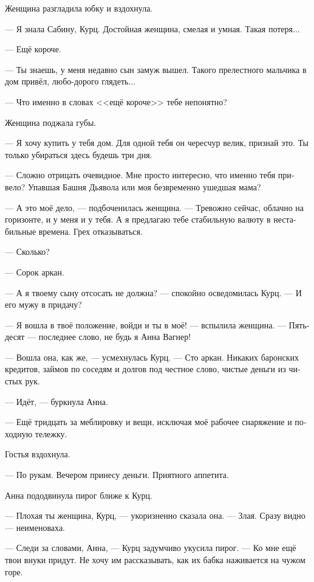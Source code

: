 \documentclass[a4paper,10pt,fleqn]{book}\usepackage{polyglossia}\setdefaultlanguage[babelshorthands=true]{russian}\setotherlanguage{english}\defaultfontfeatures{Ligatures=TeX,Mapping=tex-text}\usepackage{xcolor}\newcommand{\ml}[3]{#2}
\begin{document}
Женщина разгладила юбку и вздохнула.

--- Я знала Сабину, Курц.
Достойная женщина, смелая и умная.
Такая потеря...

--- Ещё короче.

--- Ты знаешь, у меня недавно сын замуж вышел.
Такого прелестного мальчика в дом привёл, любо-дорого глядеть...

--- Что именно в словах <<ещё короче>> тебе непонятно?

Женщина поджала губы.

--- Я хочу купить у тебя дом.
Для одной тебя он чересчур велик, признай это.
Ты только убираться здесь будешь три дня.

--- Сложно отрицать очевидное.
Мне просто интересно, что именно тебя привело?
Упавшая Башня Дьявола или моя безвременно ушедшая мама?

--- А это моё дело, --- подбоченилась женщина.
--- Тревожно сейчас, облачно на горизонте, и у меня и у тебя.
\ml{$0$}
{А я предлагаю тебе стабильную валюту в нестабильные времена.}
{All I offer you is stable currency for unstable times.}
\ml{$0$}
{Грех отказываться.}
{Too good a chance to miss.''}

--- Сколько?

--- Сорок аркан.

--- А я твоему сыну отсосать не должна? --- спокойно осведомилась Курц.
--- И его мужу в придачу?

--- Я вошла в твоё положение, войди и ты в моё! --- вспылила женщина.
--- Пятьдесят --- последнее слово, не будь я Анна Вагнер!

--- Вошла она, как же, --- усмехнулась Курц.
--- Сто аркан.
Никаких баронских кредитов, займов по соседям и долгов под честное слово, чистые деньги из чистых рук.

--- Идёт, --- буркнула Анна.

--- Ещё тридцать за меблировку и вещи, исключая моё рабочее снаряжение и походную тележку.

Гостья вздохнула.

--- По рукам.
Вечером принесу деньги.
Приятного аппетита.

Анна пододвинула пирог ближе к Курц.

--- Плохая ты женщина, Курц, --- укоризненно сказала она.
--- Злая.
Сразу видно --- неименоваха.

--- Следи за словами, Анна, --- Курц задумчиво укусила пирог.
--- Ко мне ещё твои внуки придут.
Не хочу им рассказывать, как их бабка наживается на чужом горе.
\end{document}
